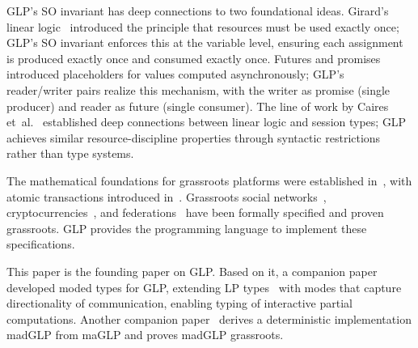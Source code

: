 GLP's SO invariant has deep connections to two foundational ideas. Girard's linear logic~\cite{girard1987linear} introduced the principle that resources must be used exactly once; GLP's SO invariant enforces this at the variable level, ensuring each assignment is produced exactly once and consumed exactly once. Futures and promises~\cite{baker1977future,friedman1976impact} introduced placeholders for values computed asynchronously; GLP's reader/writer pairs realize this mechanism, with the writer as promise (single producer) and reader as future (single consumer). The line of work by Caires et~al.~\cite{caires2010session,caires2016linear} established deep connections between linear logic and session types; GLP achieves similar resource-discipline properties through syntactic restrictions rather than type systems.

The mathematical foundations for grassroots platforms were established in~\cite{shapiro2023grassrootsBA}, with atomic transactions introduced in~\cite{shapiro2025atomic}. Grassroots social networks~\cite{shapiro2023gsn}, cryptocurrencies~\cite{shapiro2024gc,lewis2023grassroots}, and federations~\cite{halpern2024federated,shapiro2025GF} have been formally specified and proven grassroots. GLP provides the programming language to implement these specifications.

This paper is the founding paper on GLP.  Based on it, a companion paper~\cite{shapiro2026types} developed moded types for GLP, extending LP types~\cite{fruhwirth1991lics} with modes that capture directionality of communication, enabling typing of interactive partial computations. Another companion paper~\cite{shapiro2026implementing} derives a deterministic implementation madGLP from maGLP and proves madGLP grassroots.
